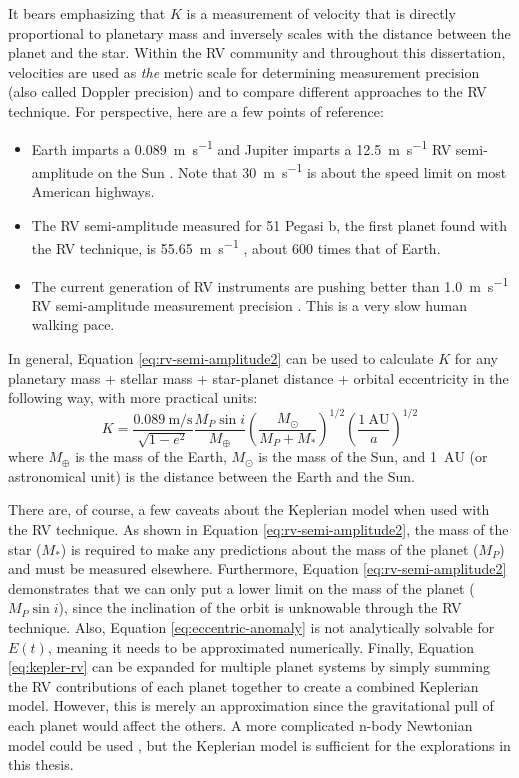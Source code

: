 It bears emphasizing that $K$ is a measurement of velocity that is directly proportional to planetary mass and inversely scales with the distance between the planet and the star. Within the RV community and throughout this dissertation, velocities are used as \textit{the} metric scale for determining measurement precision (also called Doppler precision) and to compare different approaches to the RV technique. For perspective, here are a few points of reference:
\begin{itemize}
    \item Earth imparts a 0.089~\si{\meter\per\second} and Jupiter imparts a 12.5~\si{\meter\per\second} RV semi-amplitude on the Sun \citep{lovis_radial_2011}. Note that 30~\si{\meter\per\second} is about the speed limit on most American highways.
    \item The RV semi-amplitude measured for 51 Pegasi b, the first planet found with the RV technique, is 55.65~\si{\meter\per\second} \citep{mayor_jupiter-mass_1995}, about 600 times that of Earth.
    \item The current generation of RV instruments are pushing better than 1.0~\si{\meter\per\second} RV semi-amplitude measurement precision \citep{fischer_state_2016}. This is a very slow human walking pace.
\end{itemize}
In general, Equation \ref{eq:rv-semi-amplitude2} can be used to calculate $K$ for any planetary mass + stellar mass + star-planet distance + orbital eccentricity in the following way, with more practical units:
\begin{equation}
    K = \frac{0.089~\si{\meter\per\second}}{\sqrt{1-e^2}} \frac{M_P \sin{i}}{M_\oplus} \left( \frac{M_\odot}{M_P+M_*} \right)^{1/2} \left(\frac{1~\mathrm{AU}}{a} \right)^{1/2}
\end{equation}
where $M_\oplus$ is the mass of the Earth, $M_\odot$ is the mass of the Sun, and 1~$\mathrm{AU}$ (or astronomical unit) is the distance between the Earth and the Sun.

There are, of course, a few caveats about the Keplerian model when used with the RV technique. As shown in Equation \ref{eq:rv-semi-amplitude2}, the mass of the star ($M_*$) is required to make any predictions about the mass of the planet ($M_P$) and must be measured elsewhere. Furthermore, Equation \ref{eq:rv-semi-amplitude2} demonstrates that we can only put a lower limit on the mass of the planet ($M_P\sin{i}$), since the inclination of the orbit is unknowable through the RV technique. Also, Equation \ref{eq:eccentric-anomaly} is not analytically solvable for $E(t)$, meaning it needs to be approximated numerically. Finally, Equation \ref{eq:kepler-rv} can be expanded for multiple planet systems by simply summing the RV contributions of each planet together to create a combined Keplerian model. However, this is merely an approximation since the gravitational pull of each planet would affect the others. A more complicated n-body Newtonian model could be used \citep[e.g.][]{rivera_75_2005, fischer_five_2008}, but the Keplerian model is sufficient for the explorations in this thesis.

